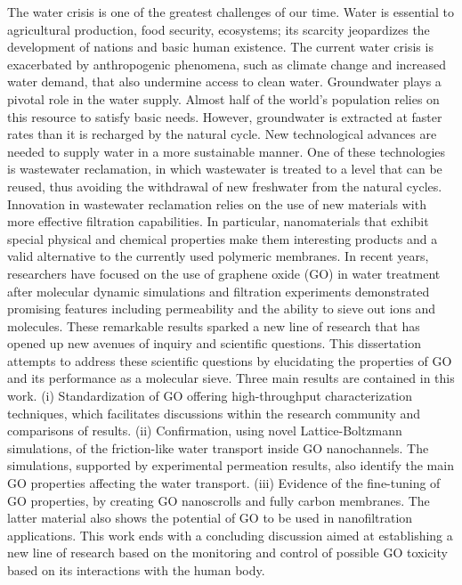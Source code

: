\justifying
The water crisis is one of the greatest challenges of our time.  Water is essential to agricultural production, food security, ecosystems; its scarcity jeopardizes the development of nations and basic human existence. The current water crisis is exacerbated by anthropogenic phenomena, such as climate change and increased water demand, that also undermine access to clean water.
Groundwater plays a pivotal role in the water supply. Almost half of the world's population relies on this resource to satisfy basic needs. However, groundwater is extracted at faster rates than it is recharged by the natural cycle. New technological advances are needed to supply water in a more sustainable manner. One of these technologies is wastewater reclamation, in which wastewater is treated to a level that can be reused, thus avoiding the withdrawal of new freshwater from the natural cycles.
Innovation in wastewater reclamation relies on the use of new materials with more effective filtration capabilities. In particular, nanomaterials that exhibit special physical and chemical properties make them interesting products and a valid alternative to the currently used polymeric membranes. In recent years, researchers have focused on the use of graphene oxide (GO) in water treatment after molecular dynamic simulations and filtration experiments demonstrated promising features including permeability and the ability to sieve out ions and molecules. These remarkable results sparked a new line of research that has opened up new avenues of inquiry and scientific questions.
This dissertation attempts to address these scientific questions by elucidating the properties of GO and its performance as a molecular sieve. Three main results are contained in this work.
  (i) Standardization of GO offering high-throughput characterization techniques, which facilitates discussions within the research community and comparisons of results.
  (ii) Confirmation, using novel Lattice-Boltzmann simulations, of the friction-like water transport inside GO nanochannels. The simulations, supported by experimental permeation results, also identify the main GO properties affecting the water transport.
  (iii) Evidence of the fine-tuning of GO properties, by creating GO nanoscrolls and fully carbon membranes. The latter material also shows the potential of GO to be used in nanofiltration applications.
This work ends with a concluding discussion aimed at establishing a new line of research based on the monitoring and control of possible GO toxicity based on its interactions with the human body.
